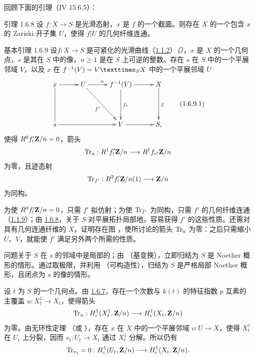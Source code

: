 回顾下面的引理（\EGA IV 15.6.5）：

\begin{enonce*}{引理 1.6.8}
设 $f:X\rightarrow S$ 是光滑态射，$x$ 是 $f$ 的一个截面。则存在 $X$ 的一个包含 $x$ 的 Zariski 开子集 $U$，使得 $f|U$ 的几何纤维连通。
\end{enonce*}

\begin{enonce*}{基本引理 1.6.9}
设\pageoriginale $f:X\rightarrow S$ 是可紧化的光滑曲线（\hyperref[XVIII.def1.1.2]{1.1.2}）\emph{（）}，$x$ 是 $X$ 的一个几何点，$s$ 是其在 $S$ 中的像，$n\geq 1$ 是在 $S$ 上可逆的整数。存在 $s$ 在 $S$ 中的一个平展邻域 $V$，以及 $x$ 在 $f^{-1}(V)=\fprod{V}{X}{S}$ 中的一个平展邻域 $U$
\begin{equation*}
\vcenter{
\xymatrix@R=1.5cm@C=1cm{
x \ar[r]\ar@{-}[d]& U\ar[rd]_{f'}\ar[r]^{u} & f^{-1}(V)\ar[r] \ar[d]^{f_v}& X\ar[d]^{f}\\
s \ar[rr]&   & V\ar[r]         & S,
}}\tag{1.6.9.1}
\end{equation*}%
使得 $R^{0}f'_{!}\protect\mathcal{\mathbf{Z}}/n=0$，箭头\emph{ }
$$
\operatorname{Tr}_{u}:R^{1}f'_{!}\protect\mathcal{\mathbf{Z}}/n\longrightarrow
R^{1}f_{v!}\protect\mathcal{\mathbf{Z}}/n
$$
为零，且迹态射
$$
\operatorname{Tr}_{f'}:R^{2}f'_{!}\protect\mathcal{\mathbf{Z}}/n(1)\longrightarrow
\protect\mathcal{\mathbf{Z}}/n
$$
为同构。
\end{enonce*}

为使 $R^{0}f'_{!}\protect\mathcal{\mathbf{Z}}/n=0$，只需 $f'$ 拟仿射；为使 $\operatorname{Tr}_{f'}$ 为同构，只需 $f'$ 的几何纤维连通（\hyperref[XVIII.lem1.1.9]{1.1.9}）；由 \hyperref[XVIII.lem1.6.8]{1.6.8}，关于 $S$ 对平展拓扑局部地，容易获得 $f'$ 的这些性质。还需对具有几何连通纤维的 $X$，证明存在图 ，使所讨论的箭头 $\operatorname{Tr}_{u}$ 为零：之后只需缩小 $U$、$V$，就能使 $f'$ 满足另外两个所需的性质。

问题关于 $S$ 在 $s$ 的邻域中是局部的；由 （基变换），立即归结为 $S$ 是 Noether 概形的情形。通过取极限，并利用 （可构造性），归结为 $S$ 是严格局部 Noether 概形，且闭点为 $s$ 的像的情形。

设 $t$ 为 $S$ 的一个几何点。由 \hyperref[XVIII.lem1.6.7]{1.6.7}，存在一个次数与 $k(t)$ 的特征指数
$p$ 互素的主覆盖 $u:X^{1}_{t}\rightarrow X_{t}$，使得箭头
$$
\operatorname{Tr}_{u}:H^{1}_{c}(X^{1}_{t},\mathbf{Z}/n)\longrightarrow
H^{1}_{c}(X_{t},\mathbf{Z}/n)
$$
为\pageoriginale{}零。由无环性定理 （或 ），存在 $x$ 在 $X$ 中的一个平展邻域 $v:U\rightarrow X$，使得 $X^{1}_{t}$ 在 $U_{t}$ 上分裂，因而 $v_{t}:U_{t}\rightarrow X_{t}$ 通过 $X^{1}_{t}$ 分解。所以仍有
$$
\operatorname{Tr}_{v_{t}}=0:H^{1}_{c}(U_{t},\mathbf{Z}/n)\longrightarrow
H^{1}_{c}(X_{t},\mathbf{Z}/n){}.
$$

